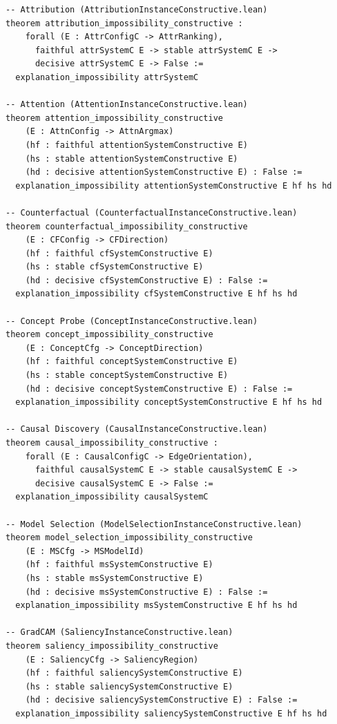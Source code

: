 \documentclass[11pt,a4paper]{article}
\begin{document}
\begin{lstlisting}[caption={Nine constructive instance impossibility theorems}]
-- Attribution (AttributionInstanceConstructive.lean)
theorem attribution_impossibility_constructive :
    forall (E : AttrConfigC -> AttrRanking),
      faithful attrSystemC E -> stable attrSystemC E ->
      decisive attrSystemC E -> False :=
  explanation_impossibility attrSystemC

-- Attention (AttentionInstanceConstructive.lean)
theorem attention_impossibility_constructive
    (E : AttnConfig -> AttnArgmax)
    (hf : faithful attentionSystemConstructive E)
    (hs : stable attentionSystemConstructive E)
    (hd : decisive attentionSystemConstructive E) : False :=
  explanation_impossibility attentionSystemConstructive E hf hs hd

-- Counterfactual (CounterfactualInstanceConstructive.lean)
theorem counterfactual_impossibility_constructive
    (E : CFConfig -> CFDirection)
    (hf : faithful cfSystemConstructive E)
    (hs : stable cfSystemConstructive E)
    (hd : decisive cfSystemConstructive E) : False :=
  explanation_impossibility cfSystemConstructive E hf hs hd

-- Concept Probe (ConceptInstanceConstructive.lean)
theorem concept_impossibility_constructive
    (E : ConceptCfg -> ConceptDirection)
    (hf : faithful conceptSystemConstructive E)
    (hs : stable conceptSystemConstructive E)
    (hd : decisive conceptSystemConstructive E) : False :=
  explanation_impossibility conceptSystemConstructive E hf hs hd

-- Causal Discovery (CausalInstanceConstructive.lean)
theorem causal_impossibility_constructive :
    forall (E : CausalConfigC -> EdgeOrientation),
      faithful causalSystemC E -> stable causalSystemC E ->
      decisive causalSystemC E -> False :=
  explanation_impossibility causalSystemC

-- Model Selection (ModelSelectionInstanceConstructive.lean)
theorem model_selection_impossibility_constructive
    (E : MSCfg -> MSModelId)
    (hf : faithful msSystemConstructive E)
    (hs : stable msSystemConstructive E)
    (hd : decisive msSystemConstructive E) : False :=
  explanation_impossibility msSystemConstructive E hf hs hd

-- GradCAM (SaliencyInstanceConstructive.lean)
theorem saliency_impossibility_constructive
    (E : SaliencyCfg -> SaliencyRegion)
    (hf : faithful saliencySystemConstructive E)
    (hs : stable saliencySystemConstructive E)
    (hd : decisive saliencySystemConstructive E) : False :=
  explanation_impossibility saliencySystemConstructive E hf hs hd


\end{lstlisting}
\end{document}
